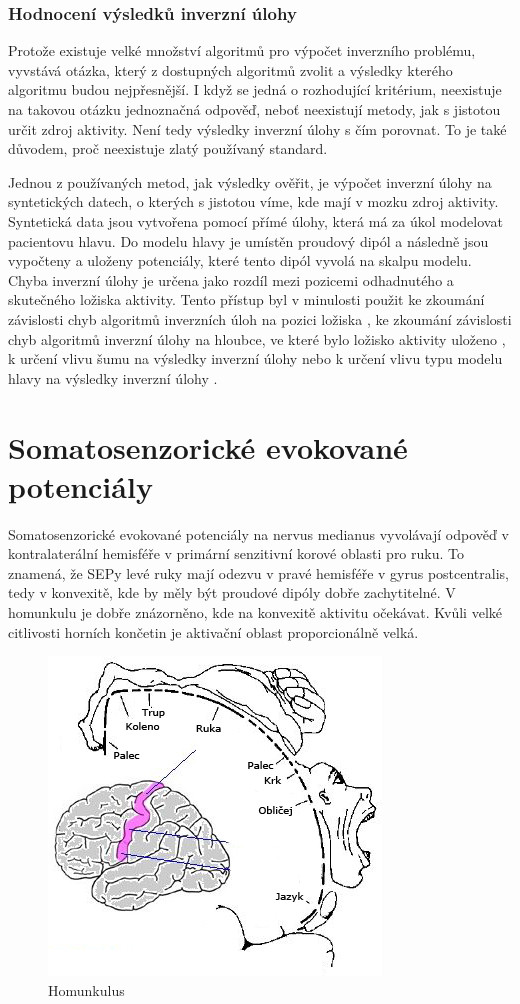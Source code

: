 \subsubsection{Hodnocení výsledků inverzní úlohy}
Protože existuje velké množství algoritmů pro výpočet inverzního problému, vyvstává otázka, který z dostupných algoritmů zvolit a výsledky kterého algoritmu budou nejpřesnější. I když se jedná o rozhodující kritérium, neexistuje na takovou otázku jednoznačná odpověď, neboť neexistují metody, jak s jistotou určit zdroj aktivity. Není tedy výsledky inverzní úlohy s čím porovnat. To je také důvodem, proč neexistuje zlatý používaný standard. \cite{29}

Jednou z používaných metod, jak výsledky ověřit, je výpočet inverzní úlohy na syntetických datech, o kterých s jistotou víme, kde mají v mozku zdroj aktivity. Syntetická data jsou vytvořena pomocí přímé úlohy, která má za úkol modelovat pacientovu hlavu. Do modelu hlavy je umístěn proudový dipól a následně jsou vypočteny a uloženy potenciály, které tento dipól vyvolá na skalpu modelu. Chyba inverzní úlohy je určena jako rozdíl mezi pozicemi odhadnutého a skutečného ložiska aktivity. Tento přístup byl v minulosti použit ke zkoumání závislosti chyb algoritmů inverzních úloh na pozici ložiska \cite{54}, ke zkoumání závislosti chyb algoritmů inverzní úlohy na hloubce, ve které bylo ložisko aktivity uloženo \cite{55}, k určení vlivu šumu na výsledky inverzní úlohy \cite{23} nebo k určení vlivu typu modelu hlavy na výsledky inverzní úlohy \cite{56}.


\section{Somatosenzorické evokované potenciály}

Somatosenzorické evokované potenciály na nervus medianus vyvolávají odpověď v kontralaterální hemisféře v primární senzitivní korové oblasti pro ruku. To znamená, že SEPy levé ruky mají odezvu v pravé hemisféře v gyrus postcentralis, tedy v konvexitě, kde by měly být proudové dipóly dobře zachytitelné. V homunkulu je dobře znázorněno, kde na konvexitě aktivitu očekávat. Kvůli velké citlivosti horních končetin je aktivační oblast proporcionálně velká. \cite{68}

\begin{figure}[!h]
\includegraphics[scale=0.5]{casti/aplikace/sep/homunculus.jpg}
\caption{Homunkulus}
\end{figure}

